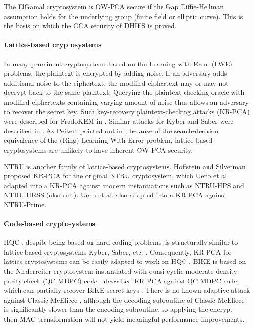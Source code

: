 \documentclass[runningheads]{llncs}
\begin{document}
The ElGamal cryptosystem \cite{DBLP:journals/tit/Elgamal85} is OW-PCA secure if the Gap Diffie-Hellman assumption \cite{DBLP:conf/pkc/OkamotoP01} holds for the underlying group (finite field or elliptic curve). This is the basis on which the CCA security of DHIES \cite{DBLP:conf/ctrsa/AbdallaBR01} is proved.

\paragraph{Lattice-based cryptosystems} In many prominent cryptosystems based on the Learning with Error (LWE) problems, the plaintext is encrypted by adding noise. If an adversary adds additional noise to the ciphertext, the modified ciphertext may or may not decrypt back to the same plaintext. Querying the plaintext-checking oracle with modified ciphertexts containing varying amount of noise thus allows an adversary to recover the secret key. Such key-recovery plaintext-checking attacks (KR-PCA) were described for FrodoKEM in \cite{DBLP:conf/crypto/GuoJN20,DBLP:conf/eurocrypt/BaetuDHTV19}. Similar attacks for Kyber and Saber were described in \cite{DBLP:conf/acns/Huguenin-Dumittan20,DBLP:conf/asiacrypt/XagawaIUTH21,DBLP:conf/pqcrypto/GuoM23}. As Peikert pointed out in \cite{cryptoeprint:2014/070}, because of the search-decision equivalence of the (Ring) Learning With Error problem, lattice-based cryptosystems are unlikely to have inherent OW-PCA security. 

NTRU is another family of lattice-based cryptosystems. Hoffstein and Silverman \cite{hoffstein1999reaction} proposed KR-PCA for the original NTRU cryptosystem, which Ueno et al. \cite{DBLP:journals/tches/UenoXTITH22} adapted into a KR-PCA against modern instantiations such as NTRU-HPS and NTRU-HRSS (also see \cite{cryptoeprint:2021/168}). Ueno et al. also adapted \cite{DBLP:conf/crypto/JaulmesJ00} into a KR-PCA against NTRU-Prime.

\paragraph{Code-based cryptosystems} HQC \cite{hamming-quasi-cyclic-4th-round-submission}, despite being based on hard coding problems, is structurally similar to lattice-based cryptosystems Kyber, Saber, etc. \cite{DBLP:journals/tches/UenoXTITH22}. Consequently, KR-PCA for lattice cryptosystems can be easily adapted to work on HQC \cite{DBLP:conf/acns/Huguenin-Dumittan20,DBLP:conf/eurocrypt/BaetuDHTV19}. BIKE \cite{bike-4th-round-submission} is based on the Niederreiter cryptosystem instantiated with quasi-cyclic moderate density parity check (QC-MDPC) code \cite{DBLP:conf/isit/MisoczkiTSB13}. \cite{DBLP:conf/asiacrypt/Guo0S16} described KR-PCA against QC-MDPC code, which can partially recover BIKE secret keys \cite{DBLP:conf/asiacrypt/XagawaIUTH21}. There is no known adaptive attack against Classic McEliece  \cite{DBLP:journals/tches/UenoXTITH22}, although the decoding subroutine of Classic McEliece is significantly slower than the encoding subroutine, so applying the encrypt-then-MAC transformation will not yield meaningful performance improvements.
\end{document}
